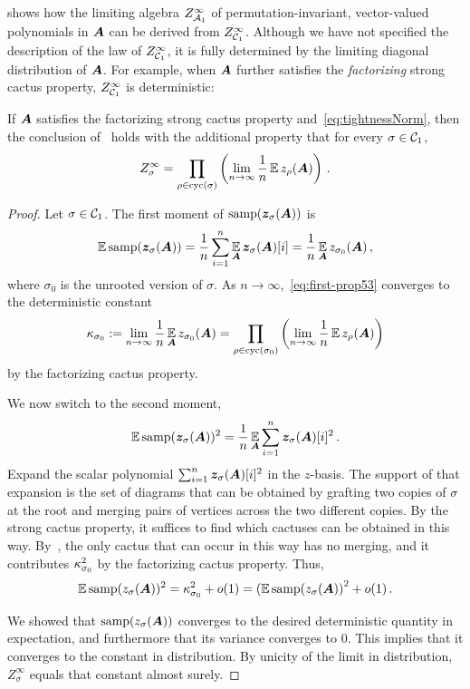  shows how
the limiting algebra $Z^\infty_{{\cal A}_1}$
of permutation-invariant, vector-valued polynomials in
${\bm A}$ can be derived from $Z^\infty_{{\cal C}_1}$.
Although we have not specified the description of the law of $Z^\infty_{{\cal C}_1}$, it is fully
determined by the limiting diagonal distribution of ${\bm A}$. For example, when ${\bm A}$ further
satisfies the
{\em factorizing} strong cactus property, $Z^\infty_{{\cal C}_1}$ is deterministic:

\begin{proposition}
    \label{prop:factorizing-deterministic}
    If ${\bm A}$ satisfies the factorizing strong 
    cactus property and~\cref{eq:tightnessNorm},
    then the conclusion of~ holds with the additional property that for every
    $\sigma\in{\cal C}_1$,
    \[
        Z^\infty_{\sigma} = \prod_{\rho\in\mathrm{cyc}(\sigma)} \left(\lim_{n\to\infty} \frac 1n \operatorname*{\mathbb{E}} z_\rho({\bm A})\right)\,.
    \]
\end{proposition}

\begin{proof}
    Let $\sigma\in{\cal C}_1$.
    The first moment of
    $\mathrm{samp}({\bm z}_\sigma({\bm A}))$ is
    \begin{align}
        \operatorname*{\mathbb{E}} \mathrm{samp}({\bm z}_\sigma({\bm A})) = \frac 1n \sum_{i=1}^n \operatorname*{\mathbb{E}}_{\bm A} {\bm z}_\sigma({\bm A})[i] = \frac 1n \operatorname*{\mathbb{E}}_{\bm A} z_{\sigma_0}({\bm A})\,,\label{eq:first-prop53}
    \end{align}
    where $\sigma_0$ is the unrooted version of $\sigma$. As $n\to\infty$,~\cref{eq:first-prop53} converges to the deterministic
    constant
    \[
        \kappa_{\sigma_0} := \lim_{n\to\infty} \frac 1n \operatorname*{\mathbb{E}}_{\bm A} z_{\sigma_0}({\bm A}) = \prod_{\rho\in\mathrm{cyc}(\sigma_0)} \left(\lim_{n\to\infty} \frac 1n \operatorname*{\mathbb{E}} z_\rho({\bm A})\right)
    \]
    by the factorizing cactus property.
    
    We now switch to the second
    moment,
    \[
        \operatorname*{\mathbb{E}} \mathrm{samp}({\bm z}_\sigma({\bm A}))^2 =  \frac 1n \operatorname*{\mathbb{E}}_{\bm A} \sum_{i=1}^n  {\bm z}_\sigma({\bm A})[i]^2\,.
    \]
    Expand the scalar polynomial $\sum_{i=1}^n {\bm z}_\sigma({\bm A})[i]^2$
    in the $z$-basis. The support of that
    expansion is
    the set of diagrams that can be
    obtained by grafting two copies
    of $\sigma$ at the root and merging
    pairs of vertices across the two
    different copies. By the strong cactus property, it suffices to find
    which cactuses can be obtained in
    this way. By~, the only
    cactus that can occur in this way
    has no merging, and it contributes
    $\kappa_{\sigma_0}^2$ by the factorizing cactus property.
    Thus,
    \[
        \operatorname*{\mathbb{E}} \mathrm{samp}(z_\sigma({\bm A}))^2 = \kappa_{\sigma_0}^2 + o(1) = \left(\operatorname*{\mathbb{E}} \mathrm{samp}(z_\sigma({\bm A})\right)^2 + o(1)\,.
    \]

    We showed that $\mathrm{samp} (z_\sigma({\bm A}))$
    converges to the desired 
    deterministic quantity in expectation,
    and furthermore that
    its variance converges to $0$.
    This implies that it converges to
    the constant in distribution. By
    unicity of the limit in distribution,
    $Z_\sigma^\infty$
    equals that constant almost surely.
\end{proof}

